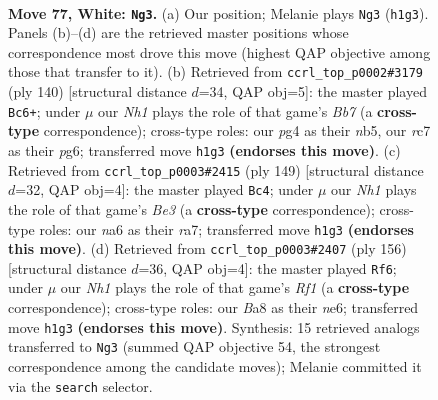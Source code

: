 \documentclass[11pt]{article}
\begin{document}
\clearpage

\begin{figure}[p]\centering
\begin{subfigure}{0.46\textwidth}\centering
\resizebox{\linewidth}{!}{%
\newchessgame
\chessboard[
  setfen={B7/2r2p2/n5p1/4P2p/b4Pp1/3k4/5K1P/7N w - - 12 77},
  showmover=false,
  pgfstyle=straightmove, color=movearrow, markmove={h1-g3}
]}
\caption{}
\end{subfigure}\hfill
\begin{subfigure}{0.46\textwidth}\centering
\resizebox{\linewidth}{!}{%
\newchessgame
\chessboard[
  setfen={8/1B1k1p1p/p5pP/1n1K2P1/1P6/4B3/7b/8 w - - 13 71},
  showmover=false,
  pgfstyle=straightmove, color=movearrow, markmove={b7-c6}
]}
\caption{}
\end{subfigure}
\\[4pt]
\begin{subfigure}{0.46\textwidth}\centering
\resizebox{\linewidth}{!}{%
\newchessgame
\chessboard[
  setfen={6k1/R7/2r1bpp1/7p/1B2P2P/5P2/6PK/8 b - - 75 75},
  showmover=false,
  pgfstyle=straightmove, color=movearrow, markmove={e6-c4}
]}
\caption{}
\end{subfigure}\hfill
\begin{subfigure}{0.46\textwidth}\centering
\resizebox{\linewidth}{!}{%
\newchessgame
\chessboard[
  setfen={8/8/1k1pn3/2p5/p3P3/Pp6/1P6/3K1R2 w - - 0 79},
  showmover=false,
  pgfstyle=straightmove, color=movearrow, markmove={f1-f6}
]}
\caption{}
\end{subfigure}
\caption{\textbf{Move 77, White: \texttt{Ng3}.} (a) Our position; Melanie plays \texttt{Ng3} (\texttt{h1g3}). Panels (b)--(d) are the retrieved master positions whose correspondence most drove this move (highest QAP objective among those that transfer to it). (b) Retrieved from \texttt{ccrl\_top\_p0002\#3179} (ply 140) [structural distance $d$=34, QAP obj=5]: the master played \texttt{Bc6+}; under $\mu$ our \emph{Nh1} plays the role of that game's \emph{Bb7} (a \textbf{cross-type} correspondence); cross-type roles: our \emph{p}g4 as their \emph{n}b5, our \emph{r}c7 as their \emph{p}g6; transferred move \texttt{h1g3} \textbf{(endorses this move)}. (c) Retrieved from \texttt{ccrl\_top\_p0003\#2415} (ply 149) [structural distance $d$=32, QAP obj=4]: the master played \texttt{Bc4}; under $\mu$ our \emph{Nh1} plays the role of that game's \emph{Be3} (a \textbf{cross-type} correspondence); cross-type roles: our \emph{n}a6 as their \emph{r}a7; transferred move \texttt{h1g3} \textbf{(endorses this move)}. (d) Retrieved from \texttt{ccrl\_top\_p0003\#2407} (ply 156) [structural distance $d$=36, QAP obj=4]: the master played \texttt{Rf6}; under $\mu$ our \emph{Nh1} plays the role of that game's \emph{Rf1} (a \textbf{cross-type} correspondence); cross-type roles: our \emph{B}a8 as their \emph{n}e6; transferred move \texttt{h1g3} \textbf{(endorses this move)}. Synthesis: 15 retrieved analogs transferred to \texttt{Ng3} (summed QAP objective 54, the strongest correspondence among the candidate moves); Melanie committed it via the \texttt{search} selector.}
\label{fig:thought-m152}
\end{figure}
\end{document}
